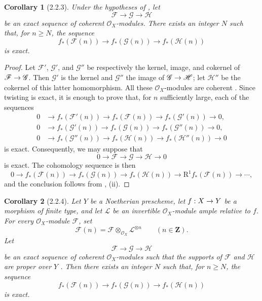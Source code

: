 \documentclass[oneside]{amsart}
\theoremstyle{ega-env-style}
\theoremstyle{ega-thm-env-style}
\newtheorem*{corollary}{Corollary}
\theoremstyle{ega-defn-env-style}
\def\mathcal{\mathscr}
\def\sh{\mathcal}                   %
\def\bb{\mathbf}                    %
\def\geq{\geqslant}                 %
\def\RR{\mathrm{R}}                 %
\renewcommand{\to}{\mathchoice{\longrightarrow}{\rightarrow}{\rightarrow}{\rightarrow}}
\newcommand{\oldpage}[2][]{{\marginnote{\normalfont{\textbf{#1}~|~#2}}}\ignorespaces}
\let\EGAOriginalLabel\label
\renewcommand{\label}[1]{\phantomsection\EGAOriginalLabel{#1}}
\begin{document}
\begin{corollary}[2.2.3]
\label{III.2.2.3}
Under the hypotheses of , let
\[
  \sh{F}\longrightarrow\sh{G}\longrightarrow\sh{H}
\]
be an exact sequence of coherent $\sh{O}_X$-modules.
There exists an integer $N$ such that, for $n\geq N$, the sequence
\[
  f_*(\sh{F}(n))
  \longrightarrow f_*(\sh{G}(n))
  \longrightarrow f_*(\sh{H}(n))
\]
is exact.
\end{corollary}

\begin{proof}
Let $\sh{F}'$, $\sh{G}'$, and $\sh{G}''$ be respectively the kernel, image, and cokernel of $\sh{F}\to\sh{G}$.
Then $\sh{G}'$ is the kernel and $\sh{G}''$ the image of $\sh{G}\to\sh{H}$; let $\sh{H}''$ be the cokernel of this latter homomorphism.
All these $\sh{O}_X$-modules are coherent .
Since twisting is exact, it is enough to prove that, for $n$ sufficiently large, each of the sequences
\begin{align*}
  0&\longrightarrow f_*(\sh{F}'(n))
    \longrightarrow f_*(\sh{F}(n))
    \longrightarrow f_*(\sh{G}'(n))
    \longrightarrow0,\\
  0&\longrightarrow f_*(\sh{G}'(n))
    \longrightarrow f_*(\sh{G}(n))
    \longrightarrow f_*(\sh{G}''(n))
    \longrightarrow0,\\
  0&\longrightarrow f_*(\sh{G}''(n))
    \longrightarrow f_*(\sh{H}(n))
    \longrightarrow f_*(\sh{H}''(n))
    \longrightarrow0
\end{align*}
is exact.
Consequently, we may suppose that
\[
  0\longrightarrow\sh{F}\longrightarrow\sh{G}
   \longrightarrow\sh{H}\longrightarrow0
\]
is exact.
The cohomology sequence is then
\[
  0\longrightarrow f_*(\sh{F}(n))
  \longrightarrow f_*(\sh{G}(n))
  \longrightarrow f_*(\sh{H}(n))
  \longrightarrow \RR^1f_*(\sh{F}(n))
  \longrightarrow\cdots,
\]
and the conclusion follows from , (ii).
\end{proof}

\oldpage[III]{102}

\begin{corollary}[2.2.4]
\label{III.2.2.4}
Let $Y$ be a Noetherian prescheme, let $f:X\to Y$ be a morphism of finite type, and let $\sh{L}$ be an invertible $\sh{O}_X$-module ample relative to $f$.
For every $\sh{O}_X$-module $\sh{F}$, set
\[
  \sh{F}(n)=\sh{F}\otimes_{\sh{O}_X}\sh{L}^{\otimes n}
  \qquad(n\in\bb{Z}).
\]
Let
\[
  \sh{F}\longrightarrow\sh{G}\longrightarrow\sh{H}
\]
be an exact sequence of coherent $\sh{O}_X$-modules such that the supports of $\sh{F}$ and $\sh{H}$ are proper over $Y$ .
Then there exists an integer $N$ such that, for $n\geq N$, the sequence
\[
  f_*(\sh{F}(n))
  \longrightarrow f_*(\sh{G}(n))
  \longrightarrow f_*(\sh{H}(n))
\]
is exact.
\end{corollary}
\end{document}
